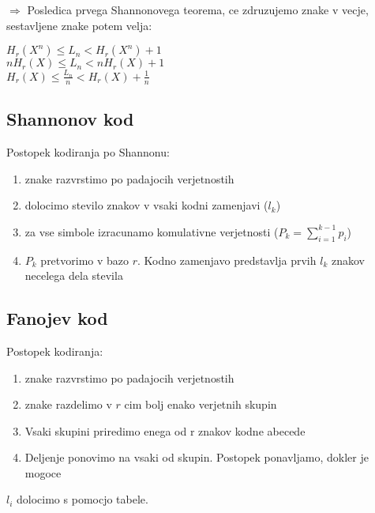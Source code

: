 \documentclass{article}
\begin{document}
\begin{multicols}{2}
	$\Rightarrow$ Posledica prvega Shannonovega teorema, ce zdruzujemo znake v vecje, sestavljene
	znake potem velja:
	\begin{center}
		\begin{math}
			H_r(X^n) \leq L_n < H_r(X^n) + 1
		\end{math} \\
		\begin{math}
			nH_r(X) \leq L_n < nH_r(X) + 1
		\end{math} \\
		\begin{math}
			H_r(X) \leq \frac{L_n}{n} < H_r(X) + \frac{1}{n}
		\end{math}
	\end{center}

	\subsection{Shannonov kod}
	Postopek kodiranja po Shannonu:
	\begin{enumerate}
		\item znake razvrstimo po padajocih verjetnostih
		\item dolocimo stevilo znakov v vsaki kodni zamenjavi ($l_k$)
		\item za vse simbole izracunamo komulativne verjetnosti ($P_k = \sum_{i=1}^{k-1} p_i$)
		\item $P_k$ pretvorimo v bazo $r$. Kodno zamenjavo predstavlja prvih $l_k$ znakov necelega dela stevila
	\end{enumerate}

	\subsection{Fanojev kod}
	Postopek kodiranja:
	\begin{enumerate}
		\item znake razvrstimo po padajocih verjetnostih
		\item znake razdelimo v $r$ cim bolj enako verjetnih skupin
		\item Vsaki skupini priredimo enega od r znakov kodne abecede
		\item Deljenje ponovimo na vsaki od skupin. Postopek ponavljamo, dokler je mogoce
	\end{enumerate}
	$l_i$ dolocimo s pomocjo tabele.


\end{multicols}
\end{document}
